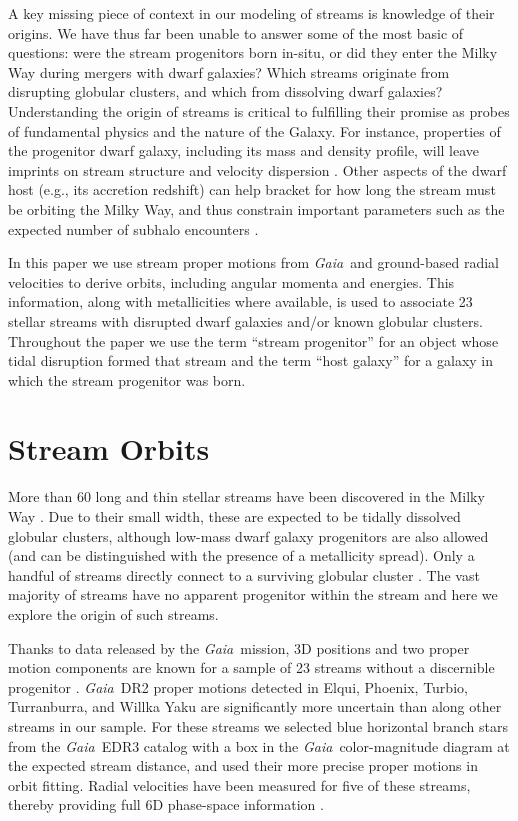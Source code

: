 \documentclass[twocolumn]{aastex63}
\newcommand{\gaia}{\textsl{Gaia}}
\begin{document}
A key missing piece of context in our modeling of streams is knowledge of their origins. 
We have thus far been unable to answer some of the most basic of questions: were the stream progenitors born in-situ, or did they enter the Milky Way during mergers with dwarf galaxies?
Which streams originate from disrupting globular clusters, and which from dissolving dwarf galaxies?
Understanding the origin of streams is critical to fulfilling their promise as probes of fundamental physics and the nature of the Galaxy.
For instance, properties of the progenitor dwarf galaxy, including its mass and density profile, will leave imprints on stream structure and velocity dispersion \citep[][]{carlberg2018, malhan2020}.
Other aspects of the dwarf host (e.g., its accretion redshift) can help bracket for how long the stream must be orbiting the Milky Way, and thus constrain important parameters such as the expected number of subhalo encounters \citep[e.g.,][]{erkal2016}.

In this paper we use stream proper motions from \gaia\ and ground-based radial velocities to derive orbits, including angular momenta and energies.
This information, along with metallicities where available, is used to associate 23 stellar streams with disrupted dwarf galaxies and/or known globular clusters.
Throughout the paper we use the term ``stream progenitor'' for an object whose tidal disruption formed that stream and the term ``host galaxy'' for a galaxy in which the stream progenitor was born.

\section{Stream Orbits}
\label{sec:streamorbits}
More than 60 long and thin stellar streams have been discovered in the Milky Way \citep[see][for an up-to-date catalog]{mateu2018}.
Due to their small width, these are expected to be tidally dissolved globular clusters, although low-mass dwarf galaxy progenitors are also allowed (and can be distinguished with the presence of a metallicity spread).
Only a handful of streams directly connect to a surviving globular cluster \citep[e.g.,][]{rockosi2002, grillmair2006b}.
The vast majority of streams have no apparent progenitor within the stream and here we explore the origin of such streams.

Thanks to data released by the \gaia\ mission, 3D positions and two proper motion components are known for a sample of 23 streams without a discernible progenitor \citep{ibata2019, shipp2019, riley2020}.
\gaia\ DR2 proper motions detected in Elqui, Phoenix, Turbio, Turranburra, and Willka Yaku are significantly more uncertain than along other streams in our sample.
For these streams we selected blue horizontal branch stars from the \gaia\ EDR3 catalog \citep{gaiaedr3} with a box in the \gaia\ color-magnitude diagram at the expected stream distance, and used their more precise proper motions in orbit fitting.
Radial velocities have been measured for five of these streams, thereby providing full 6D phase-space information \citep{caldwell2020, li2020, bonaca2020b}.
\end{document}
